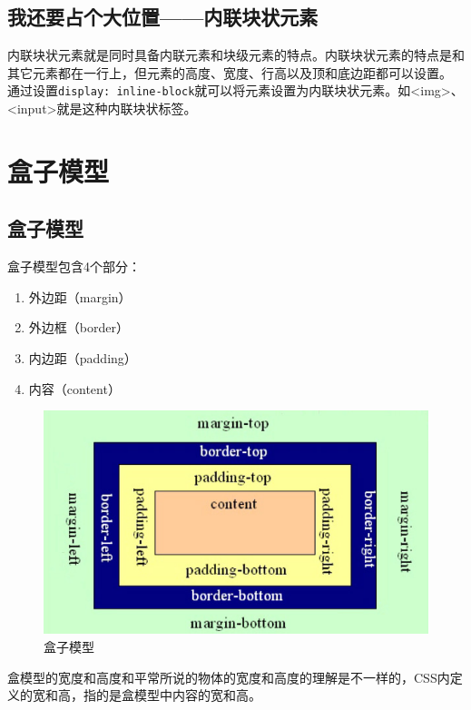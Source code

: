 \subsection{我还要占个大位置——内联块状元素}

内联块状元素就是同时具备内联元素和块级元素的特点。内联块状元素的特点是和其它元素都在一行上，但元素的高度、宽度、行高以及顶和底边距都可以设置。\\

通过设置\lstinline|display: inline-block|就可以将元素设置为内联块状元素。如<img>、<input>就是这种内联块状标签。

\newpage

\section{盒子模型}

\subsection{盒子模型}

盒子模型包含4个部分：

\begin{enumerate}
	\item 外边距（margin）
	\item 外边框（border）
	\item 内边距（padding）
	\item 内容（content）
\end{enumerate}

\begin{figure}[H]
	\centering
	\includegraphics[scale=0.7]{img/C8/8-2/1.png}
	\caption{盒子模型}
\end{figure}

盒模型的宽度和高度和平常所说的物体的宽度和高度的理解是不一样的，CSS内定义的宽和高，指的是盒模型中内容的宽和高。\\


